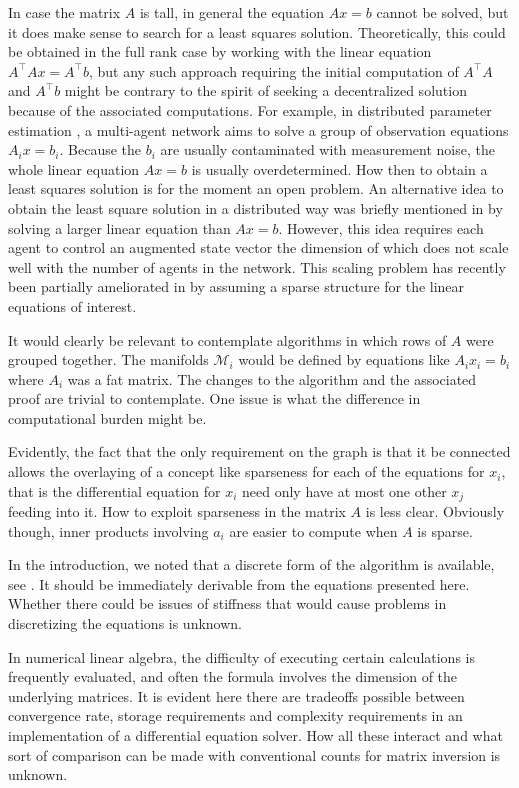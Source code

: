 \documentclass{aims}
\begin{document}
In case the matrix $A$ is tall, in general the equation $Ax=b$ cannot be solved, but it does make sense to search for a least squares solution. Theoretically, this could be obtained in the full rank case by working with the linear equation $A^{\top}Ax=A^{\top}b$, but any such approach requiring the initial computation of $A^{\top}A$ and $A^{\top}b$ might be contrary to the spirit of seeking a decentralized solution because of  the associated computations.  For example, in distributed parameter estimation \cite{SJK12IT}, a multi-agent network aims to solve a group of observation equations $A_ix=b_i$. Because the $b_i$ are usually contaminated with measurement noise, the whole linear equation $Ax=b$ is usually overdetermined.  How then to obtain a least squares solution is for the moment an open problem. An alternative idea to obtain the least square solution in a distributed way was briefly mentioned in \cite{SJA14TAC} by solving a larger linear equation than $Ax=b$. However, this idea requires each agent to control an augmented state vector the dimension of which does not scale well with the number of agents in the network. This scaling problem has recently been partially ameliorated in \cite{SAZLD15SCL} by assuming a sparse structure for the linear equations of interest.

It would clearly be relevant to contemplate algorithms in which rows of $A$ were grouped together. The manifolds $\mathcal M_i$ would be defined by equations like $A_ix_i=b_i$ where $A_i$ was a fat matrix. The changes to the algorithm and the associated proof are trivial to contemplate. One issue is what the difference in computational burden might be.

Evidently, the fact that the only requirement on the graph is that it be connected allows the overlaying of a concept like sparseness for each of the equations for $x_i$, that is the differential equation for $x_i$ need only have at most one other $x_j$ feeding into it.  How to exploit sparseness in the matrix $A$ is less clear. Obviously though, inner products involving $a_i$ are easier to compute when $A$ is sparse.

In the introduction, we noted that a discrete form of the algorithm is available, see \cite{SA13ECC,SJA13Allerton,SJA14TAC}. It should be immediately derivable from the equations presented here. Whether there could be issues of stiffness that would cause problems in discretizing the equations is unknown.

In numerical linear algebra, the difficulty of executing certain calculations is frequently evaluated, and often the formula involves the dimension of the underlying matrices. It is evident here there are tradeoffs possible between convergence rate, storage requirements and complexity requirements in an implementation of a differential equation solver. How all these interact and what sort of comparison can be made with conventional counts for matrix inversion is unknown.
\end{document}
